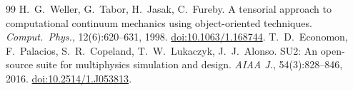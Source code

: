 \documentclass[11pt]{article}
\begin{document}
\begin{thebibliography}{99}
 H.\ G.\ Weller, G.\ Tabor, H.\ Jasak, C.\ Fureby. A tensorial approach to computational continuum mechanics using object-oriented techniques. \emph{Comput.\ Phys.}, 12(6):620--631, 1998. \href{https://doi.org/10.1063/1.168744}{doi:10.1063/1.168744}.
 T.\ D.\ Economon, F.\ Palacios, S.\ R.\ Copeland, T.\ W.\ Lukaczyk, J.\ J.\ Alonso. SU2: An open-source suite for multiphysics simulation and design. \emph{AIAA J.}, 54(3):828--846, 2016. \href{https://doi.org/10.2514/1.J053813}{doi:10.2514/1.J053813}.
\end{thebibliography}
\end{document}
